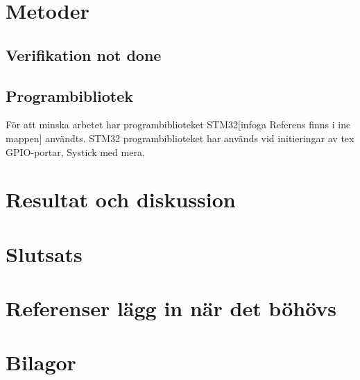 \documentclass{article}
\begin{document}
\section{Metoder}
\subsection{Verifikation not done}
\subsection{Programbibliotek}
För att minska arbetet har programbiblioteket STM32[infoga Referens finns i inc mappen]
användts. 
STM32 programbiblioteket har används vid initieringar av tex GPIO-portar, Systick med mera.

\section{Resultat och diskussion} %
\section{Slutsats}
\section{Referenser lägg in när det böhövs}


\section{Bilagor}
\end{document}
